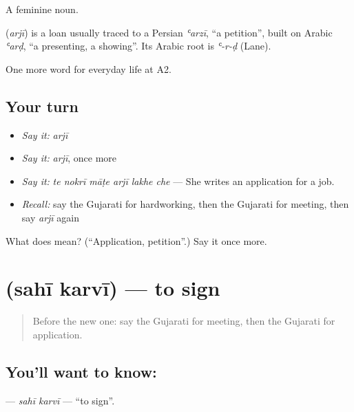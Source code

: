 A feminine noun.

\begin{cousinweb}
\textbf{} (\emph{arjī}) is a loan usually traced to a Persian \emph{ʿarzī}, \textquotedblleft{}a petition\textquotedblright{}, built on Arabic \emph{ʿarḍ}, \textquotedblleft{}a presenting, a showing\textquotedblright{}. Its Arabic root is \emph{ʿ-r-ḍ} (Lane).
\end{cousinweb}

\begin{grammarlens}[title={What you've built}]
One more word for everyday life at A2.
\end{grammarlens}

\subsection*{Your turn}
\begin{itemize}
\raggedright
  \item \emph{Say it:} \emph{arjī}
  \item \emph{Say it:} \emph{arjī}, once more
  \item \emph{Say it:} \emph{te nokrī māṭe arjī lakhe che} — She writes an application for a job.
  \item \emph{Recall:} say the Gujarati for hardworking, then the Gujarati for meeting, then say \emph{arjī} again
\end{itemize}

\begin{tcolorbox}[breakable,colback=teal!4,colframe=teal!35!black,title={Before you move on}]
What does  mean? (\textquotedblleft{}Application, petition\textquotedblright{}.) Say it once more.
\end{tcolorbox}
\section[\texorpdfstring{\gu{સહી} \gu{કરવી} (sahī karvī)}{સહી કરવી (sahī karvī)}]{  (sahī karvī) — to sign}

\label{lesson:GU-C248-sahi-karvi}



\begin{quote}
Before the new one: say the Gujarati for meeting, then the Gujarati for application.
\end{quote}

\subsection*{You'll want to know:  }
\textbf{ } — \emph{sahī karvī} — \textquotedblleft{}to sign\textquotedblright{}.

